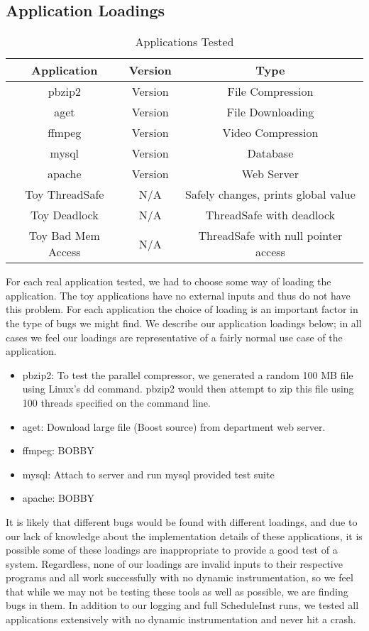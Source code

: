 \documentclass[10pt,]{article} %
\begin{document}
\subsection{Application Loadings}
\begin{table}
\centering
\begin{tabular}{ |c|c|c| }
\hline
Application & Version &Type \\ \hline \hline
pbzip2 & Version & File Compression \\ \hline
aget   & Version & File Downloading \\ \hline
ffmpeg & Version & Video Compression \\ \hline
mysql  & Version & Database\\ \hline
apache & Version & Web Server\\ \hline
Toy ThreadSafe & N/A & Safely changes, prints global value \\ \hline
Toy Deadlock & N/A & ThreadSafe with deadlock\\ \hline
Toy Bad Mem Access &N/A& ThreadSafe with null pointer access \\ \hline
\end{tabular}
\caption{Applications Tested}
\label{appsTest}
\end{table}

For each real application tested, we had to choose some way of loading the application.  The toy applications have no external inputs and thus do not have this problem.  For each application the choice of loading is an important factor in the type of bugs we might find.  We describe our application loadings below; in all cases we feel our loadings are representative of a fairly normal use case of the application.  

\begin{itemize}
  \item pbzip2: To test the parallel compressor, we generated a random 100 MB file using Linux's dd command.  pbzip2 would then attempt to zip this file using 100 threads specified on the command line. 
  \item aget: Download large file (Boost source) from department web server. 
  \item ffmpeg: BOBBY 
  \item mysql: Attach to server and run mysql provided test suite 
  \item apache: BOBBY
\end{itemize}

It is likely that different bugs would be found with different loadings, and due to our lack of knowledge about the implementation details of these applications, it is possible some of these loadings are inappropriate to provide a good test of a system.  Regardless, none of our loadings are invalid inputs to their respective programs and all work successfully with no dynamic instrumentation, so we feel that while we may not be testing these tools as well as possible, we are finding bugs in them.  In addition to our logging and full ScheduleInst runs, we tested all applications extensively with no dynamic instrumentation and never hit a crash.
\end{document}
